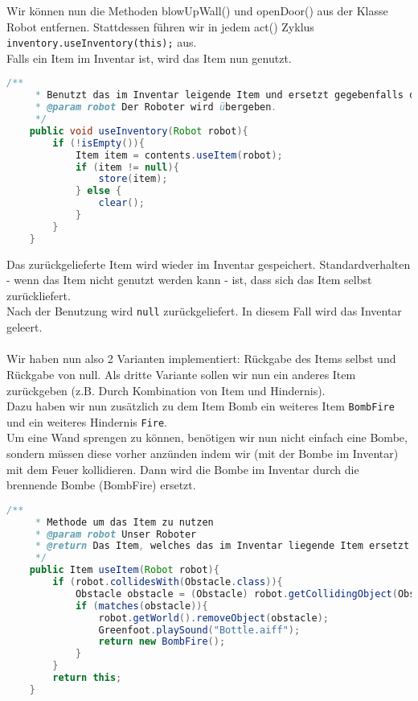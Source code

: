 \documentclass{pi1}
\begin{document}
Wir können nun die Methoden blowUpWall() und openDoor() aus der Klasse Robot entfernen. Stattdessen führen wir in jedem act() Zyklus \texttt{inventory.useInventory(this);} aus.
\\
Falls ein Item im Inventar ist, wird das Item nun genutzt.

\begin{lstlisting}[caption={Klasse \emph{Inventory}, Methode \emph{useInventory}}, firstnumber=67, language=Java]
/**
     * Benutzt das im Inventar leigende Item und ersetzt gegebenfalls das Item
     * @param robot Der Roboter wird übergeben.
     */
    public void useInventory(Robot robot){
        if (!isEmpty()){
            Item item = contents.useItem(robot);
            if (item != null){
                store(item);
            } else {
                clear();
            }
        }
    }
\end{lstlisting}

Das zurückgelieferte Item wird wieder im Inventar gespeichert. Standardverhalten - wenn das Item nicht genutzt werden kann - ist, dass sich das Item selbst zurückliefert.\\
Nach der Benutzung wird \texttt{null} zurückgeliefert. In diesem Fall wird das Inventar geleert.\\
\\
Wir haben nun also 2 Varianten implementiert: Rückgabe des Items selbst und Rückgabe von null. Als dritte Variante sollen wir nun ein anderes Item zurückgeben (z.B. Durch Kombination von Item und Hindernis).\\
Dazu haben wir nun zusätzlich zu dem Item Bomb ein weiteres Item \texttt{BombFire} und ein weiteres Hindernis \texttt{Fire}.\\
Um eine Wand sprengen zu können, benötigen wir nun nicht einfach eine Bombe, sondern müssen diese vorher anzünden indem wir (mit der Bombe im Inventar) mit dem Feuer kollidieren. Dann wird die Bombe im Inventar durch die brennende Bombe (BombFire) ersetzt.

\begin{lstlisting}[caption={Klasse \emph{Bomb}, Methode \emph{useItem()}},firstnumber=11, language=Java]
/**
     * Methode um das Item zu nutzen
     * @param robot Unser Roboter
     * @return Das Item, welches das im Inventar liegende Item ersetzt
     */
    public Item useItem(Robot robot){
        if (robot.collidesWith(Obstacle.class)){
            Obstacle obstacle = (Obstacle) robot.getCollidingObject(Obstacle.class);
            if (matches(obstacle)){
                robot.getWorld().removeObject(obstacle);
                Greenfoot.playSound("Bottle.aiff");
                return new BombFire();
            }
        }
        return this;
    }
\end{lstlisting}
\end{document}
